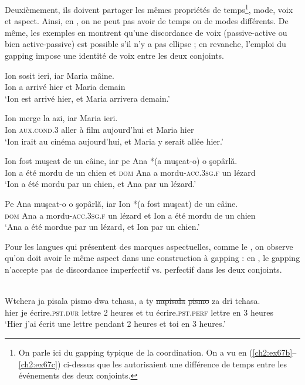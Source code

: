 Deuxièmement, ils doivent partager les mêmes propriétés de temps\footnote{
 On parle ici du gapping typique de la coordination. On a vu en (\ref{ch2:ex67b}--\ref{ch2:ex67c}) ci-dessus que les  autorisaient une différence de temps entre les événements des deux conjoints.}, mode, voix et aspect. Ainsi, en , on ne peut pas avoir de temps ou de modes différents. De même, les exemples en  montrent qu’une discordance de voix (passive-active ou bien active-passive) est possible s’il n’y a pas ellipse ; en revanche, l’emploi du gapping impose une identité de voix entre les deux conjoints.


\ea \label{ch2:ex96}
\ea 
\gll *Ion    sosit  ieri,  iar  Maria  mâine.\\
Ion  a  arrivé  hier  et  Maria  demain\\
\glt ‘Ion est arrivé hier, et Maria arrivera demain.’

\ex   
\gll *Ion    merge  la    azi,  iar  Maria  ieri.\\ 
Ion  \textsc{aux.cond.3}  aller  à  film  aujourd’hui  et  Maria  hier\\
\glt ‘Ion irait au cinéma aujourd’hui, et Maria y serait allée hier.’
\z
\z

\ea \label{ch2:ex97}
\ea 
\gll Ion    fost  muşcat  de  un  câine,  iar  pe  Ana  *(a  muşcat-o)  o  şopârlă.\\
Ion  a  été  mordu  de  un  chien  et  \textsc{dom} Ana  a  mordu-\textsc{acc.3sg.f} un  lézard\\
\glt ‘Ion a été mordu par un chien, et Ana par un lézard.’

\ex  
\gll Pe  Ana    muşcat-o  o  şopârlă,  iar  Ion  *(a  fost  muşcat)  de  un  câine.\\
\textsc{dom} Ana  a  mordu-\textsc{acc.3sg.f} un  lézard  et  Ion  a  été  mordu  de  un  chien\\ 
\glt  ‘Ana a été mordue par un lézard, et Ion par un chien.’
\z
\z

Pour les langues qui présentent des marques aspectuelles, comme le , on observe qu’on doit avoir le même aspect dans une construction à gapping : en  , le gapping n’accepte pas de discordance imperfectif vs. perfectif dans les deux conjoints.

\ea \label{ch2:ex98}
\\
\gll *Wtchera  ja  pisala  pismo  dwa  tchasa,  a  ty  \st{napisala} \st{pismo}  za  dri tchasa.\\ 
hier  je  écrire.\textsc{pst.dur} lettre  2  heures  et  tu  écrire.\textsc{pst.perf} lettre  en 3 heures\\ 
\glt ‘Hier j’ai écrit une lettre pendant 2 heures et toi en 3 heures.’             
\z


